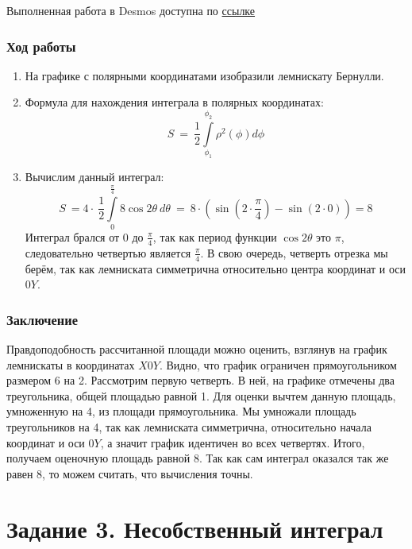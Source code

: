 \documentclass{article}
\begin{document}
Выполненная работа в Desmos доступна по 
\href{https://www.desmos.com/calculator/23qokppxuf?lang=ru}{ссылке}

\subsubsection*{Ход работы}

\begin{enumerate}
    \item На графике с полярными координатами изобразили лемнискату Бернулли.
    
    \item Формула для нахождения интеграла в полярных координатах:
    $$
    S\ =\ \frac{1}{2}\int\limits_{\phi_{1}}^{\phi_{2}}\rho^{2}\left(\phi\right)d\phi$$
    
    \item Вычислим данный интеграл:
    $$
    S\ =4\cdot\ \frac{1}{2}\int\limits_{0}^{\frac{\pi}{4}}8\cos2\theta\ d\theta\ =\ 8\cdot\left(\sin\left(2\cdot\frac{\pi}{4}\right)-\sin\left(2\cdot0\right)\right)=8
    $$
        Интеграл брался от 0 до $\frac{\pi}{4}$, так как период функции $\cos2\theta$ это $\pi$, следовательно четвертью является $\frac{\pi}{4}$. В свою очередь, четверть отрезка мы берём, так как лемниската симметрична относительно центра координат и оси $0Y$.

    
\end{enumerate}

\subsubsection*{Заключение}

Правдоподобность рассчитанной площади можно оценить, взглянув на график лемнискаты в координатах $X0Y$. Видно, что график ограничен прямоугольником размером 6 на 2. Рассмотрим первую четверть. В ней, на графике отмечены два треугольника, общей площадью равной 1. Для оценки вычтем данную площадь, умноженную на 4, из площади прямоугольника. Мы умножали площадь треугольников на 4, так как лемниската симметрична, относительно начала координат и оси $0Y$, а значит график идентичен во всех четвертях. Итого, получаем оценочную площадь равной 8. Так как сам интеграл оказался так же равен 8, то можем считать, что вычисления точны.

\newpage


\section{Задание 3. Несобственный интеграл}
\end{document}
